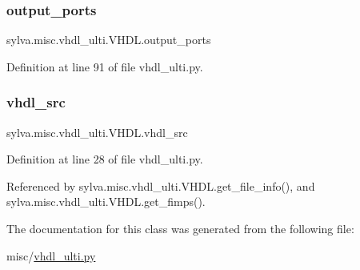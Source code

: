 \subsubsection{\texorpdfstring{output\+\_\+ports}{output\_ports}}
{\footnotesize\ttfamily sylva.\+misc.\+vhdl\+\_\+ulti.\+V\+H\+D\+L.\+output\+\_\+ports}



Definition at line 91 of file vhdl\+\_\+ulti.\+py.

\mbox{\label{classsylva_1_1misc_1_1vhdl__ulti_1_1_v_h_d_l_a7f2afc1d3df1f99f831393beb2a51e86}} 
\subsubsection{\texorpdfstring{vhdl\+\_\+src}{vhdl\_src}}
{\footnotesize\ttfamily sylva.\+misc.\+vhdl\+\_\+ulti.\+V\+H\+D\+L.\+vhdl\+\_\+src}



Definition at line 28 of file vhdl\+\_\+ulti.\+py.



Referenced by sylva.\+misc.\+vhdl\+\_\+ulti.\+V\+H\+D\+L.\+get\+\_\+file\+\_\+info(), and sylva.\+misc.\+vhdl\+\_\+ulti.\+V\+H\+D\+L.\+get\+\_\+fimps().



The documentation for this class was generated from the following file\+:\begin{DoxyCompactItemize}
\item 
misc/\hyperlink{vhdl__ulti_8py}{vhdl\+\_\+ulti.\+py}\end{DoxyCompactItemize}
